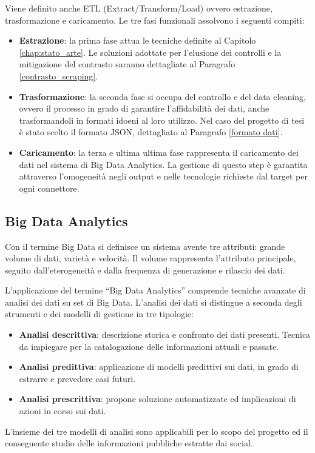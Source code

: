 Viene definito anche ETL (Extract/Transform/Load) ovvero estrazione, trasformazione e caricamento. Le tre fasi funzionali assolvono i seguenti compiti:
\begin{itemize}
    \item \textbf{Estrazione}: la prima fase attua le tecniche definite al Capitolo \ref{chap:stato_arte}. Le soluzioni adottate per l'elusione dei controlli e la mitigazione del contrasto saranno dettagliate al Paragrafo \ref{contrasto_scraping}. 
    \item \textbf{Trasformazione}: la seconda fase  si occupa del controllo e del data cleaning, ovvero il processo in grado di garantire l'affidabilit\`a dei dati, anche trasformandoli in formati idoeni al loro utilizzo. Nel caso del progetto di tesi \`e stato scelto il formato JSON, dettagliato al Paragrafo \ref{formato dati}.
    \item \textbf{Caricamento}: la terza e ultima ultima fase rappresenta il caricamento dei dati nel sistema di Big Data Analytics. La gestione di questo step \`e garantita attraverso l'omogeneit\`a negli output e nelle tecnologie richieste dal target per ogni connettore.
\end{itemize}


\subsection{Big Data Analytics}
Con il termine Big Data si definisce un sistema avente tre attributi: grande volume di dati, variet\`a e velocit\`a. 
Il volume rappresenta l'attributo principale, seguito dall'eterogeneità e dalla frequenza di generazione e rilascio dei dati.

L'applicazione del termine ``Big Data Analytics'' comprende tecniche avanzate di analisi dei dati su set di Big Data.\cite{russom2011big}
L'analisi dei dati si distingue a seconda degli strumenti e dei modelli di gestione in tre tipologie:
\begin{itemize}
    \item \textbf{Analisi descrittiva}: descrizione storica e confronto dei dati presenti. Tecnica da impiegare per la catalogazione delle informazioni attuali e passate. 
    \item \textbf{Analisi predittiva}: applicazione di modelli predittivi sui dati, in grado di estrarre e prevedere casi futuri. 
    \item \textbf{Analisi prescrittiva}: propone soluzione automatizzate ed implicazioni di azioni in corso sui dati.
\end{itemize}
L'insieme dei tre modelli di analisi sono applicabili per lo scopo del progetto ed il conseguente studio delle informazioni pubbliche estratte dai social.
